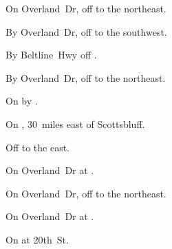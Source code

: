 
\begin{LocationList}

On Overland~Dr, off   to the northeast.

By Overland~Dr, off   to the southwest.

By Beltline~Hwy off .

\Location{\GarageHQ \Garage}
By Overland~Dr, off   to the northeast.

On  by .

On , 30~miles east of Scottsbluff.

Off  to the east.

On Overland~Dr at  .

\Location{\TruckService \Service}
On Overland~Dr, off   to the northeast.

\Location{\TruckStop \Gas \Rest}
On Overland~Dr at  .

On  at 20th~St.

\end{LocationList}
